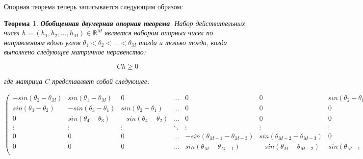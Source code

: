 \documentclass[a4paper, 12pt, titlepage]{article}
\theoremstyle{definition}
\theoremstyle{plain}
\newtheorem{SmartTheorem}{Теорема}
\theoremstyle{plain}
\begin{document}
Опорная теорема теперь записывается следующим образом:

\begin{SmartTheorem}
 \label{thm:ext-support-theorem-2d}
 \textbf{Обобщенная двумерная опорная теорема}.
 Набор действительных чисел
 $h = (h_{1}, h_{2}, \ldots, h_{M}) \in \mathbb{R}^{M}$
 является набором опорных чисел по направлениям вдоль углов
 $\theta_{1} < \theta_{2} < \ldots < \theta_{M}$ тогда и только тогда, когда
 выполнено следующее матричное неравенство:

 \begin{equation}
 C h \geq 0
 \end{equation}

 где матрица $C$ представляет собой следующее:

 \begin{equation}
  \left(
  \begin{array}{ccccccc}

   \scriptstyle     -sin(\theta_{2} - \theta_{M}) &
   \scriptstyle     sin(\theta_{1} - \theta_{M}) &
   \scriptstyle     0 &
   \scriptstyle     \ldots &
   \scriptstyle     0 &
   \scriptstyle     0 &
   \scriptstyle     sin(\theta_{2} - \theta_{1}) \\

   \scriptstyle      sin(\theta_{3} - \theta_{2}) &
   \scriptstyle      -sin(\theta_{3} - \theta_{1}) &
   \scriptstyle      sin(\theta_{2} - \theta_{1}) &
   \scriptstyle      \ldots &
   \scriptstyle      0 &
   \scriptstyle      0 &
   \scriptstyle      0 \\

   \scriptstyle      0 &
   \scriptstyle      sin(\theta_{4} - \theta_{3}) &
   \scriptstyle      -sin(\theta_{4} - \theta_{2}) &
   \scriptstyle      \ldots &
   \scriptstyle      0 &
   \scriptstyle      0 &
   \scriptstyle      0 \\

   \scriptstyle      \vdots &
   \scriptstyle      \vdots &
   \scriptstyle      \vdots &
   \scriptstyle      \ddots &
   \scriptstyle      \vdots &
   \scriptstyle      \vdots &
   \scriptstyle      \vdots \\

   \scriptstyle      0 &
   \scriptstyle      0 &
   \scriptstyle      0 &
   \scriptstyle      \ldots &
   \scriptstyle      -sin(\theta_{M - 1} - \theta_{M - 3}) &
   \scriptstyle      sin(\theta_{M - 2} - \theta_{M - 3}) &
   \scriptstyle      0 \\

   \scriptstyle      0 &
   \scriptstyle      0 &
   \scriptstyle      0 &
   \scriptstyle      \ldots &
   \scriptstyle      sin(\theta_{M} - \theta_{M - 1}) &
   \scriptstyle      -sin(\theta_{M} - \theta_{M - 2}) &
   \scriptstyle      sin(\theta_{M - 1} - \theta_{M - 2}) \\


\end{array}
\end{equation}
\end{SmartTheorem}
\end{document}
